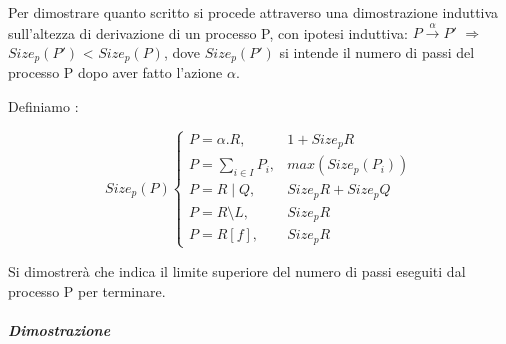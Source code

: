 Per dimostrare quanto scritto si procede attraverso una dimostrazione induttiva sull'altezza di derivazione di un processo P, con ipotesi induttiva: \(P \overset{\alpha}\rightarrow P'\) $\Rightarrow$ $Size_{p}(P')$ < $Size_{p}(P)$, dove $Size_{p}(P')$ si intende il numero di passi del processo P dopo aver fatto l'azione $\alpha$.

Definiamo :

\[
Size_{p}(P)
\begin{cases}
P=\alpha.R,     & 1+Size_{p}{R}                \\
P=\displaystyle\sum_{i\in I}^{}P_{i},          & max(Size_{p}(P_{i})) \\
P=R\mid Q,      & Size_{p}{R}+Size_{p}{Q}       \\
P=R\setminus L, & Size_{p}{R}                  \\
P=R[f],         & Size_{p}{R}
\end{cases}
\]

Si dimostrerà che  indica il limite superiore del numero di passi eseguiti dal processo P per terminare.

\subparagraph{Dimostrazione} \mbox{}

